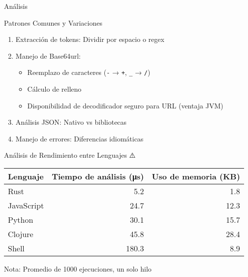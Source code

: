 \documentclass[presentation,aspectratio=169]{beamer}
\begin{document}
\begin{frame}[label={sec:org407a009},fragile]{Análisis}
 \begin{block}{Patrones Comunes y Variaciones 🧩}
\begin{enumerate}[<+->]
\item \alert{Extracción de tokens}: Dividir por espacio o regex
\item \alert{Manejo de Base64url}:
\begin{itemize}
\item Reemplazo de caracteres (\texttt{-} → \texttt{+}, \texttt{\_} → \texttt{/})
\item Cálculo de relleno
\item Disponibilidad de decodificador seguro para URL (ventaja JVM)
\end{itemize}
\item \alert{Análisis JSON}: Nativo vs bibliotecas
\item \alert{Manejo de errores}: Diferencias idiomáticas
\end{enumerate}
\end{block}
\begin{block}{Análisis de Rendimiento entre Lenguajes ⚠️}
\begin{center}
\begin{tabular}{lrr}
Lenguaje & Tiempo de análisis (μs) & Uso de memoria (KB)\\
\hline
Rust & 5.2 & 1.8\\
JavaScript & 24.7 & 12.3\\
Python & 30.1 & 15.7\\
Clojure & 45.8 & 28.4\\
Shell & 180.3 & 8.9\\
\end{tabular}
\end{center}

\alert{Nota: Promedio de 1000 ejecuciones, un solo hilo}
\end{block}
\end{frame}
\end{document}
